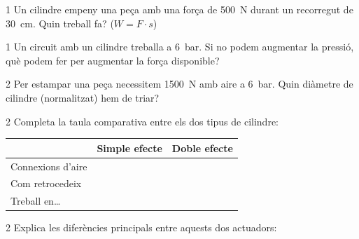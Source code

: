 \begin{exercici}{1}
Un cilindre empeny una peça amb una força de \SI{500}{\newton} durant un recorregut de \SI{30}{\centi\meter}. Quin treball fa? ($W = F\cdot s$)
\end{exercici}

\begin{exercici}{1}
Un circuit amb un cilindre treballa a \SI{6}{\bar}. Si no podem augmentar la pressió, què podem fer per augmentar la força disponible?
\end{exercici}

\begin{exercici}{2}
Per estampar una peça necessitem \SI{1500}{\newton} amb aire a \SI{6}{\bar}. Quin diàmetre de cilindre (normalitzat) hem de triar?
\end{exercici}

\begin{exercici}{2}
Completa la taula comparativa entre els dos tipus de cilindre:
\begin{center}
\renewcommand{\arraystretch}{2}
\begin{tabular}{@{}lp{5cm}p{5cm}@{}}
\toprule
 & \textbf{Simple efecte} & \textbf{Doble efecte}\\
\midrule
Connexions d'aire & & \\
Com retrocedeix & & \\
Treball en\ldots & & \\
\bottomrule
\end{tabular}
\end{center}
\end{exercici}

\begin{exercici}{2}
Explica les diferències principals entre aquests dos actuadors:\\
\hspace{2cm}
\end{exercici}

